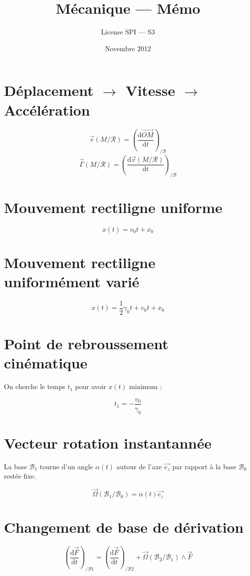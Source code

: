 \documentclass[a4paper, 11pt]{article}
\title{Mécanique — Mémo}
\author{License SPI — S3}
\date{Novembre 2012}
\newcommand{\V}{\overrightarrow}
\newcommand{\R}{\mathcal{R}}
\newcommand{\B}{\mathcal{B}}
\newcommand{\D}{\mathrm{d}}
\begin{document}
    \maketitle

\section{Déplacement $\rightarrow$ Vitesse $\rightarrow$ Accélération} %

$$\V{v}(M/\R) = \left(\frac{\D\V{OM}}{\D t}\right)_{/\B}$$
$$\V{\Gamma}(M/\R) = \left(\frac{\D\V{v}(M/\R)}{\D t}\right)_{/\B}$$

\section{Mouvement rectiligne uniforme} %

$$x(t) = v_0t + x_0$$

\section{Mouvement rectiligne uniformément varié} %

$$x(t) = \frac{1}{2}\gamma_0t + v_0t + x_0$$

\section{Point de rebroussement cinématique} %

On cherche le temps $t_1$ pour avoir $x(t)$ minimum :

$$t_1 = -\frac{v_0}{\gamma_0}$$

\section{Vecteur rotation instantannée} %

La base $\B_1$ tourne d'un angle $\alpha(t)$ autour de l'axe $\V{e_z}$ par rapport à la base $\B_0$ restée fixe.

$$\V{\Omega}(\B_1/\B_0) = \dot{\alpha}(t)\V{e_z}$$

\section{Changement de base de dérivation} %

$$\left(\frac{\D\V{F}}{\D t}\right)_{/\B1} =  \left(\frac{\D\V{F}}{\D t}\right)_{/\B2} + \V{\Omega}(\B_2/\B_1)\wedge\V{F}$$
\end{document}
